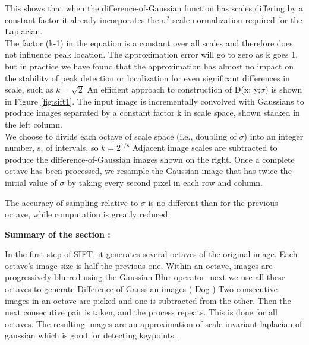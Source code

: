 This shows that when the difference-of-Gaussian function has scales differing by a constant
factor it already incorporates the  $\sigma ^2 $
scale normalization required for the Laplacian. \\The
factor (k-1) in the equation is a constant over all scales and therefore does not influence
peak location. The approximation error will go to zero as k goes 1, but in practice we have
found that the approximation has almost no impact on the stability of peak detection or
localization for even significant differences in scale, such as $k= \sqrt{2}$
An efficient approach to construction of D(x; y;$\sigma$) is shown in Figure \ref{fig:sift1}. The input image
is incrementally convolved with Gaussians to produce images separated by a constant
factor k in scale space, shown stacked in the left column. \\We choose to divide each octave
of scale space (i.e., doubling of $\sigma$) into an integer number, s, of intervals, so $k = 2^{1/\mathbf{s}}$
Adjacent image scales are subtracted to produce the difference-of-Gaussian images shown
on the right. Once a complete octave has been processed, we resample the Gaussian image
that has twice the initial value of $\sigma$ by taking every second pixel in each row and column. \newline

The accuracy of sampling relative to $\sigma$ is no different than for the previous octave, while
computation is greatly reduced.

\textbf{Summary of the section :}

In the first step of SIFT, it generates several octaves of the original image. Each octave's image size is half the previous one. Within an octave, images are progressively blurred using the Gaussian Blur operator.
next we use all these octaves to generate Difference of Gaussian images ( Dog ) Two consecutive images in an octave are picked and one is subtracted from the other. Then the next consecutive pair is taken, and the process repeats. This is done for all octaves. The resulting images are an approximation of scale invariant laplacian of gaussian which is good for detecting keypoints .


